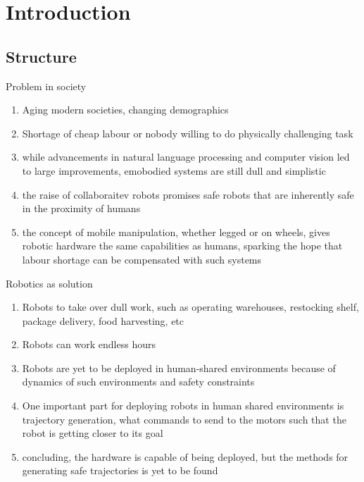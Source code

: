 \chapter{Introduction} %
\label{cha:Introduction}


\iffalse
\section{Structure}

Problem in society
\begin{enumerate}
  \item Aging modern societies, changing demographics
  \item Shortage of cheap labour or nobody willing to do physically challenging
  task
  \item while advancements in natural language processing and computer vision
  led to large improvements, emobodied systems are still dull and simplistic
  \item the raise of collaboraitev robots promises safe robots that are
  inherently safe in the proximity of humans
  \item the concept of mobile manipulation, whether legged or on wheels, gives
  robotic hardware the same capabilities as humans, sparking the hope that
  labour shortage can be compensated with such systems
\end{enumerate}
Robotics as solution
\begin{enumerate}
  \item Robots to take over dull work, such as operating warehouses, restocking
  shelf, package delivery, food harvesting, etc
  \item Robots can work endless hours
  \item Robots are yet to be deployed in human-shared environments because of
  dynamics of such environments and safety constraints
  \item One important part for deploying robots in human shared environments is
  trajectory generation, what commands to send to the motors such that the robot
  is getting closer to its goal
  \item concluding, the hardware is capable of being deployed, but the methods
  for generating safe trajectories is yet to be found
\end{enumerate}
